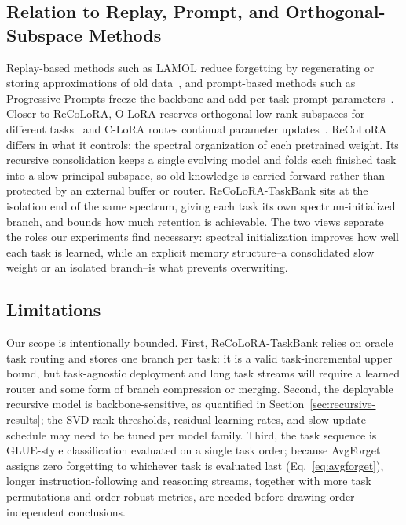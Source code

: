 \documentclass[11pt]{article}
\begin{document}
\subsection{Relation to Replay, Prompt, and Orthogonal-Subspace Methods}
Replay-based methods such as LAMOL reduce forgetting by regenerating or storing approximations of old data~\cite{sun2019lamol}, and prompt-based methods such as Progressive Prompts freeze the backbone and add per-task prompt parameters~\cite{razdaibiedina2023progressiveprompts}. Closer to ReCoLoRA, O-LoRA reserves orthogonal low-rank subspaces for different tasks~\cite{wang2023olora} and C-LoRA routes continual parameter updates~\cite{zhang2025clora}. ReCoLoRA differs in what it controls: the spectral organization of each pretrained weight. Its recursive consolidation keeps a single evolving model and folds each finished task into a slow principal subspace, so old knowledge is carried forward rather than protected by an external buffer or router. ReCoLoRA-TaskBank sits at the isolation end of the same spectrum, giving each task its own spectrum-initialized branch, and bounds how much retention is achievable. The two views separate the roles our experiments find necessary: spectral initialization improves how well each task is learned, while an explicit memory structure--a consolidated slow weight or an isolated branch--is what prevents overwriting.

\subsection{Limitations}
\label{sec:limitations}
Our scope is intentionally bounded. First, ReCoLoRA-TaskBank relies on oracle task routing and stores one branch per task: it is a valid task-incremental upper bound, but task-agnostic deployment and long task streams will require a learned router and some form of branch compression or merging. Second, the deployable recursive model is backbone-sensitive, as quantified in Section~\ref{sec:recursive-results}; the SVD rank thresholds, residual learning rates, and slow-update schedule may need to be tuned per model family. Third, the task sequence is GLUE-style classification evaluated on a single task order; because AvgForget assigns zero forgetting to whichever task is evaluated last (Eq.~\ref{eq:avgforget}), longer instruction-following and reasoning streams, together with more task permutations and order-robust metrics, are needed before drawing order-independent conclusions.
\end{document}
